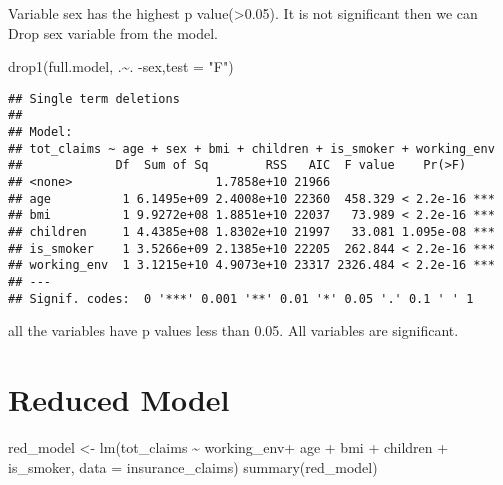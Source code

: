 \documentclass[
]{article}
\newenvironment{Shaded}{\begin{snugshade}}{\end{snugshade}}
\newcommand{\AttributeTok}[1]{\textcolor[rgb]{0.77,0.63,0.00}{#1}}
\newcommand{\FunctionTok}[1]{\textcolor[rgb]{0.00,0.00,0.00}{#1}}
\newcommand{\NormalTok}[1]{#1}
\newcommand{\OtherTok}[1]{\textcolor[rgb]{0.56,0.35,0.01}{#1}}
\newcommand{\SpecialCharTok}[1]{\textcolor[rgb]{0.00,0.00,0.00}{#1}}
\newcommand{\StringTok}[1]{\textcolor[rgb]{0.31,0.60,0.02}{#1}}
\begin{document}
Variable sex has the highest p value(\textgreater0.05). It is not
significant then we can Drop sex variable from the model.

\begin{Shaded}
\begin{Highlighting}[]
\FunctionTok{drop1}\NormalTok{(full.model, .}\SpecialCharTok{\textasciitilde{}}\NormalTok{. }\SpecialCharTok{{-}}\NormalTok{sex,}\AttributeTok{test =} \StringTok{"F"}\NormalTok{)}
\end{Highlighting}
\end{Shaded}

\begin{verbatim}
## Single term deletions
## 
## Model:
## tot_claims ~ age + sex + bmi + children + is_smoker + working_env
##             Df  Sum of Sq        RSS   AIC  F value    Pr(>F)    
## <none>                    1.7858e+10 21966                       
## age          1 6.1495e+09 2.4008e+10 22360  458.329 < 2.2e-16 ***
## bmi          1 9.9272e+08 1.8851e+10 22037   73.989 < 2.2e-16 ***
## children     1 4.4385e+08 1.8302e+10 21997   33.081 1.095e-08 ***
## is_smoker    1 3.5266e+09 2.1385e+10 22205  262.844 < 2.2e-16 ***
## working_env  1 3.1215e+10 4.9073e+10 23317 2326.484 < 2.2e-16 ***
## ---
## Signif. codes:  0 '***' 0.001 '**' 0.01 '*' 0.05 '.' 0.1 ' ' 1
\end{verbatim}

all the variables have p values less than 0.05. All variables are
significant.

\hypertarget{reduced-model}{%
\section{Reduced Model}\label{reduced-model}}

\begin{Shaded}
\begin{Highlighting}[]
\NormalTok{red\_model }\OtherTok{\textless{}{-}} \FunctionTok{lm}\NormalTok{(tot\_claims }\SpecialCharTok{\textasciitilde{}}\NormalTok{ working\_env}\SpecialCharTok{+}\NormalTok{ age }\SpecialCharTok{+}\NormalTok{ bmi }\SpecialCharTok{+}\NormalTok{ children }\SpecialCharTok{+}\NormalTok{ is\_smoker, }\AttributeTok{data =}\NormalTok{ insurance\_claims)}
\FunctionTok{summary}\NormalTok{(red\_model)}
\end{Highlighting}
\end{Shaded}
\end{document}
